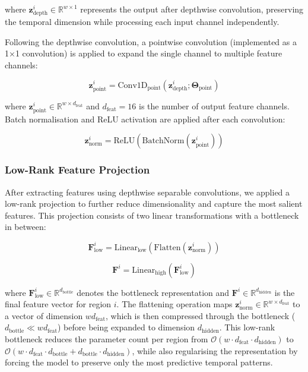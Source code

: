 \documentclass[final,1p,times]{elsarticle}
\begin{document}
where $\mathbf{z}^i_{\text{depth}} \in \mathbb{R}^{w \times 1}$ represents the output after depthwise convolution, preserving the temporal dimension while processing each input channel independently.

Following the depthwise convolution, a pointwise convolution (implemented as a 1×1 convolution) is applied to expand the single channel to multiple feature channels:

\begin{equation}
\mathbf{z}^i_{\text{point}} = \text{Conv1D}_{\text{point}}(\mathbf{z}^i_{\text{depth}}; \boldsymbol{\Theta}_{\text{point}})
\end{equation}

where $\mathbf{z}^i_{\text{point}} \in \mathbb{R}^{w \times d_{\text{feat}}}$ and $d_{\text{feat}} = 16$ is the number of output feature channels. Batch normalisation and ReLU activation are applied after each convolution:

\begin{equation}
\mathbf{z}^i_{\text{norm}} = \text{ReLU}(\text{BatchNorm}(\mathbf{z}^i_{\text{point}}))
\end{equation}

\subsubsection{Low-Rank Feature Projection}

After extracting features using depthwise separable convolutions, we applied a low-rank projection to further reduce dimensionality and capture the most salient features. This projection consists of two linear transformations with a bottleneck in between:

\begin{equation}
\mathbf{F}^i_{\text{low}} = \text{Linear}_{\text{low}}(\text{Flatten}(\mathbf{z}^i_{\text{norm}}))
\end{equation}

\begin{equation}
\mathbf{F}^i = \text{Linear}_{\text{high}}(\mathbf{F}^i_{\text{low}})
\end{equation}

where $\mathbf{F}^i_{\text{low}} \in \mathbb{R}^{d_{\text{bottle}}}$ denotes the bottleneck representation and $\mathbf{F}^i \in \mathbb{R}^{d_{\text{hidden}}}$ is the final feature vector for region $i$. The flattening operation maps $\mathbf{z}^i_{\text{norm}} \in \mathbb{R}^{w \times d_{\text{feat}}}$ to a vector of dimension $w d_{\text{feat}}$, which is then compressed through the bottleneck ($d_{\text{bottle}} \ll w d_{\text{feat}}$) before being expanded to dimension $d_{\text{hidden}}$. This low-rank bottleneck reduces the parameter count per region from $\mathcal{O}(w \cdot d_{\text{feat}} \cdot d_{\text{hidden}})$ to $\mathcal{O}(w \cdot d_{\text{feat}} \cdot d_{\text{bottle}} + d_{\text{bottle}} \cdot d_{\text{hidden}})$, while also regularising the representation by forcing the model to preserve only the most predictive temporal patterns.
\end{document}
